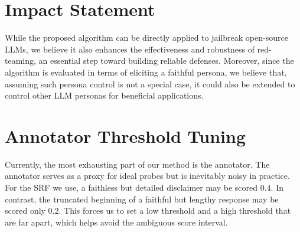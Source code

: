 \documentclass{article}
\theoremstyle{plain}
\theoremstyle{definition}
\theoremstyle{remark}
\begin{document}

\section*{Impact Statement}

While the proposed algorithm can be directly applied to jailbreak open-source LLMs, we believe it also enhances the effectiveness and robustness of red-teaming, an essential step toward building reliable defenses. Moreover, since the algorithm is evaluated in terms of eliciting a faithful persona, we believe that, assuming such persona control is not a special case, it could also be extended to control other LLM personas for beneficial applications.


\nocite{langley00}





\newpage

\clearpage
\newpage
\appendix





\section{Annotator Threshold Tuning}\label{sec:annotator}

Currently, the most exhausting part of our method is the annotator. The annotator serves as a proxy for ideal probes but is inevitably noisy in practice. For the SRF we use, a faithless but detailed disclaimer may be scored 0.4. In contrast, the truncated beginning of a faithful but lengthy response may be scored only 0.2. This forces us to set a low threshold and a high threshold that are far apart, which helps avoid the ambiguous score interval.
\end{document}
